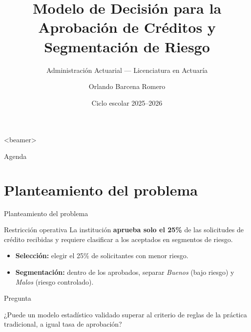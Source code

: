 \documentclass[10pt,aspectratio=169]{beamer}
\title[Modelo de Decisión de Crédito]{Modelo de Decisión para la Aprobación
  de Créditos y Segmentación de Riesgo}
\subtitle{Administración Actuarial --- Licenciatura en Actuaría}
\author{Orlando Barcena Romero}
\institute{Facultad de Estudios Superiores Acatlán, UNAM}
\date{Ciclo escolar 2025--2026}
\begin{document}
\begin{frame}<beamer>
  \titlepage
\end{frame}

\begin{frame}{Agenda}
  \tableofcontents
\end{frame}

\section{Planteamiento del problema}
\begin{frame}{Planteamiento del problema}
  \begin{block}{Restricción operativa}
    La institución \textbf{aprueba solo el 25\%} de las solicitudes de crédito
    recibidas y requiere clasificar a los aceptados en segmentos de riesgo.
  \end{block}
  \begin{itemize}
    \item \textbf{Selección:} elegir el 25\% de solicitantes con menor riesgo.
    \item \textbf{Segmentación:} dentro de los aprobados, separar \emph{Buenos}
          (bajo riesgo) y \emph{Malos} (riesgo controlado).
  \end{itemize}
  \vspace{0.5em}
  \begin{alertblock}{Pregunta}
    \begin{center}
      ¿Puede un modelo estadístico validado superar al criterio de reglas de
      la práctica tradicional, a igual tasa de aprobación?
    \end{center}
  \end{alertblock}
\end{frame}

\end{document}
